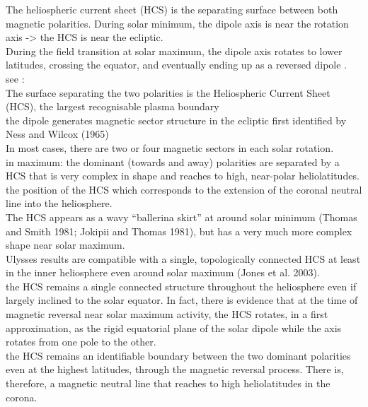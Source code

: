 The heliospheric current sheet (HCS) is the separating surface between both magnetic polarities. During solar minimum, the dipole axis is near the rotation axis -> the HCS is near the ecliptic.\\
During the field transition at solar maximum, the dipole axis rotates to lower latitudes, crossing the equator, and eventually ending up as a reversed dipole \citep{Jones2003}.\\






see \citet[p.~89]{Balogh2009}:\\
The surface separating the two polarities is the Heliospheric Current Sheet (HCS), the largest recognisable plasma boundary\\

the dipole generates magnetic sector structure in the ecliptic first identified by Ness and Wilcox (1965)\\
In most cases, there are two or four magnetic sectors in each solar rotation.\\

in maximum: the dominant (towards and away) polarities are separated by a HCS that is very complex in shape and reaches to high, near-polar heliolatitudes.\\
the position of the HCS which corresponds to the extension of the coronal neutral line into the heliosphere.\\
The HCS appears as a wavy “ballerina skirt” at around solar minimum (Thomas and Smith 1981; Jokipii and Thomas 1981), but has a very much more complex shape near solar maximum.\\
Ulysses results are compatible with a single, topologically connected HCS at least in the inner heliosphere even around solar maximum (Jones et al. 2003).\\
the HCS remains a single connected structure throughout the heliosphere even if largely inclined to the solar equator. In fact, there is evidence that at the time of magnetic reversal near solar maximum activity, the HCS rotates, in a first approximation, as the rigid equatorial plane of the solar dipole while the axis rotates from one pole to the other.\\
the HCS remains an identifiable boundary between the two dominant polarities even at the highest latitudes, through the magnetic reversal process. There is, therefore, a magnetic neutral line that reaches to high heliolatitudes in the corona.\\


